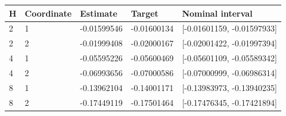 \begin{tabular}{lllll}
H & Coordinate & Estimate & Target & Nominal interval \\
\hline
2 & 1 & -0.01599546 & -0.01600134 & [-0.01601159, -0.01597933] \\
2 & 2 & -0.01999408 & -0.02000167 & [-0.02001422, -0.01997394] \\
4 & 1 & -0.05595226 & -0.05600469 & [-0.05601109, -0.05589342] \\
4 & 2 & -0.06993656 & -0.07000586 & [-0.07000999, -0.06986314] \\
8 & 1 & -0.13962104 & -0.14001171 & [-0.13983973, -0.13940235] \\
8 & 2 & -0.17449119 & -0.17501464 & [-0.17476345, -0.17421894] \\
\end{tabular}
